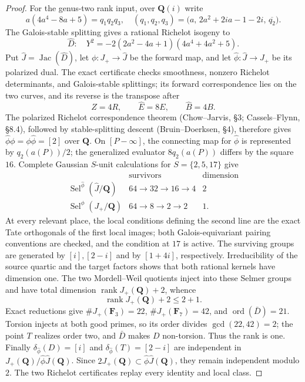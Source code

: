 \documentclass[11pt]{article}
\newcommand{\Q}{\mathbf Q}
\begin{document}
\begin{proof}
For the genus-two rank input, over $\Q(i)$ write
\[
 a(4a^4-8a+5)=q_1q_2q_3,\quad
 (q_1,q_2,q_3)=
 \bigl(a,\,2a^2+2ia-1-2i,\,\overline {q_2}\bigr).
\]
The Galois-stable splitting gives a rational Richelot isogeny to
\[
 \widehat D:\quad
 Y^2=-2(2a^2-4a+1)(4a^4+4a^2+5).
\]
Put \(\widehat J=\operatorname{Jac}(\widehat D)\), let
\(\phi:J_+\to\widehat J\) be the forward map, and let
\(\widehat\phi:\widehat J\to J_+\) be its polarized dual.  The exact
certificate checks smoothness, nonzero Richelot determinants, and
Galois-stable splittings; its forward correspondence lies on the two curves,
and its reverse is the transpose after
\[
 Z=4R,\qquad \widehat E=8E,\qquad\widehat B=4B.
\]
The polarized Richelot correspondence theorem
(Chow--Jarvis, \S3; Cassels--Flynn, \S8.4), followed by stable-splitting
descent (Bruin--Doerksen, \S4), therefore gives
\(\widehat\phi\phi=\phi\widehat\phi=[2]\) over \(\Q\).
On \([P-\infty]\), the connecting map for \(\widehat\phi\) is represented by
\(q_2(a(P))/2\); the generalized evaluator \(8q_2(a(P))\) differs by the
square \(16\).
Complete Gaussian $S$-unit calculations for $S=\{2,5,17\}$ give
\[
\begin{array}{c|c|c}
 &\text{survivors}&\text{dimension}\\ \hline
\operatorname{Sel}^{\widehat\phi}(\widehat J/\Q)&64\to32\to16\to4&2\\
\operatorname{Sel}^{\phi}(J_+/\Q)&64\to8\to2\to2&1.
\end{array}
\]
At every relevant place, the local conditions defining the second line are
the exact Tate orthogonals of the first local images; both Galois-equivariant
pairing conventions are checked, and the condition at $17$ is active.
The surviving groups are generated by \([i],[2-i]\) and by \([1+4i]\),
respectively.  Irreducibility of the source quartic and the target factors
shows that both rational kernels have dimension one.  The two Mordell--Weil
quotients inject into these Selmer groups and have total dimension
\(\operatorname{rank}J_+(\Q)+2\), whence
\[
 \operatorname{rank}J_+(\Q)+2\le2+1.
\]
Exact reductions give
\(\#J_+(\mathbf F_3)=22\), \(\#J_+(\mathbf F_7)=42\), and
\(\operatorname{ord}(\bar D)=21\).  Torsion injects at both good primes, so
its order divides \(\gcd(22,42)=2\); the point \(T\) realizes order two, and
\(\bar D\) makes \(D\) non-torsion.  Thus the rank is one.  Finally
\(\delta_{\widehat\phi}(D)=[i]\) and
\(\delta_{\widehat\phi}(T)=[2-i]\) are independent in
\(J_+(\Q)/\widehat\phi\widehat J(\Q)\).  Since
\(2J_+(\Q)\subset\widehat\phi\widehat J(\Q)\), they remain independent
modulo \(2\).  The two Richelot certificates replay every identity and
local class.


\end{proof}
\end{document}
